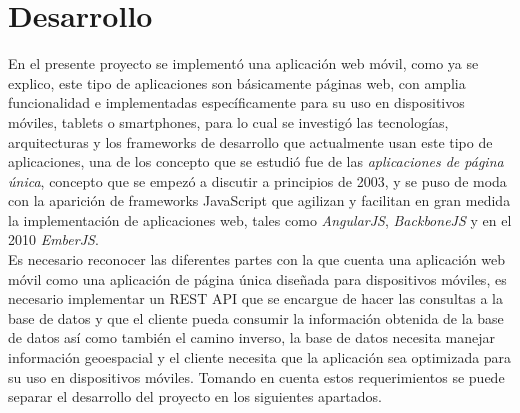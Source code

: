 \chapter{Desarrollo}
\label{chap:desarrollo}



En el presente proyecto se implementó una aplicación web móvil, como ya se explico, este tipo de aplicaciones son básicamente páginas web, con amplia funcionalidad e implementadas específicamente para su uso en dispositivos móviles, tablets o smartphones, para lo cual se investigó las tecnologías, arquitecturas y los frameworks de desarrollo que actualmente usan este tipo de aplicaciones, una de los concepto que se estudió fue de las \emph{aplicaciones de página única}, concepto que se empezó a discutir a principios de 2003, y se puso de moda con la aparición de frameworks JavaScript que agilizan y facilitan en gran medida la implementación de aplicaciones web, tales como \emph{AngularJS}, \emph{BackboneJS} y en el 2010 \emph{EmberJS}. \\

Es necesario reconocer las diferentes partes con la que cuenta una aplicación web móvil como una aplicación de página única diseñada para dispositivos móviles, es necesario implementar un REST API que se encargue de hacer las consultas a la base de datos y que el cliente pueda consumir la información obtenida de la base de datos así como también el camino inverso, la base de datos necesita manejar información geoespacial y el cliente necesita que la aplicación sea optimizada para su uso en dispositivos móviles. Tomando en cuenta estos requerimientos se puede separar el desarrollo del proyecto en los siguientes apartados. \\






